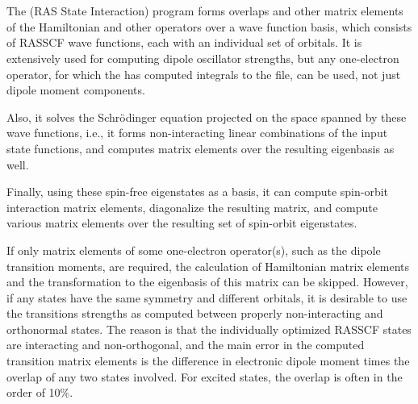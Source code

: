 
\section{}
\label{UG:sec:rassi}

The
 (RAS State Interaction) program forms overlaps and
other matrix
elements of the Hamiltonian and other operators
over a wave function basis, which consists of RASSCF wave functions,
each with an individual set of orbitals. It is extensively used
for computing dipole oscillator strengths, but any
one-electron operator, for which the  has computed
integrals to the  file, can be used, not just dipole
moment components.

Also, it solves the Schr{\"o}dinger
equation projected on the space spanned by  these wave functions,
i.e., it forms non-interacting linear combinations of the input
state functions, and computes matrix elements over the resulting
eigenbasis as well.

Finally, using these spin-free eigenstates as a basis, it can
compute spin-orbit interaction matrix elements, diagonalize
the resulting matrix, and compute various matrix elements over
the resulting set of spin-orbit eigenstates.

If only matrix
elements of some one-{}electron operator(s), such as the dipole
transition moments, are required, the calculation of Hamiltonian
matrix elements and the transformation to the eigenbasis of this
matrix can be skipped. However, if any states have the same symmetry
and different orbitals, it is desirable to use the transitions strengths
as computed between properly non-interacting and orthonormal states.
The reason is that the individually optimized RASSCF states are
interacting and non-{}orthogonal, and the main error in the computed
transition matrix elements is the difference in electronic dipole
moment times the overlap of any two states involved. For excited
states, the overlap is often in the order of 10\%.

